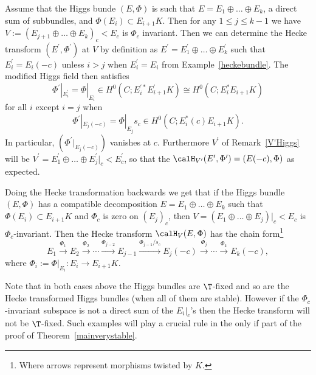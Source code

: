 \begin{example}
\notready\label{invarianthecke} Assume that the Higgs bunde $(E,\Phi)$ is such that $E=E_1\oplus \dots \oplus E_k$, a direct sum of subbundles, and $\Phi(E_i)\subset E_{i+1}K$. Then for any $1\leq j \leq k-1$ we have  $V:=(E_{j+1}\oplus \dots \oplus E_k)_c<E_c$ is $\Phi_c$ invariant. Then we can determine the Hecke transform $(E^\prime,\Phi^\prime)$ at $V$ by definition as $E^\prime=E_1^\prime \oplus \dots \oplus E^\prime_k$ such that $E_i^\prime=E_i(-c)$ unless $i>j$ when $E_i^\prime=E_i$ from Example~\ref{heckebundle}.  The modified Higgs field then satisfies $$\Phi^\prime|_{E^\prime_i}=\Phi|_{E_i}\in H^0(C;E_i^{\prime*}E^\prime_{i+1}K)\cong H^0(C;E_i^*E_{i+1}K)$$ for all $i$ except $i=j$ when $$\Phi^\prime|_{E_{j}(-c)}=\Phi|_{E_j}s_c\in H^0(C;E_i^*(c)E_{i+1}K).$$ In particular, $(\Phi^\prime|_{E_{j}(-c)})$ vanishes at $c$.
Furthermore $V^\prime$ of Remark~\ref{V'Higgs} will be $V^\prime=E^\prime_1\oplus \dots \oplus E^\prime_{j}|_c<E^\prime_c$, so that the $\calH_{V^\prime}(E^\prime,\Phi^\prime)=(E(-c),\Phi)$ as expected.

Doing the Hecke transformation backwards we get that if the Higgs bundle $(E,\Phi)$ has a compatible decomposition $E=E_1\oplus\dots\oplus E_k$ such that $\Phi(E_i)\subset E_{i+1}K$ and $\Phi_c$ is zero on $(E_j)_c$, then $V=(E_1\oplus \dots \oplus E_{j})|_c<E_c$ is $\Phi_c$-invariant.  Then the Hecke transform
$\calH_{V}(E,\Phi)$ has the chain form\footnote{Where arrows represent morphisms twisted by $K$.}
$$E_1\stackrel{\Phi_1}{\longrightarrow}{E_2}\stackrel{\Phi_2}{\longrightarrow}\cdots \stackrel{\Phi_{j-2}}{\longrightarrow}E_{j-1} \stackrel{\Phi_{j-1}/s_c}{\longrightarrow} E_j(-c)\stackrel{\Phi_{j}}{\longrightarrow}\cdots \stackrel{\Phi_{k}}{\longrightarrow}{E_k(-c)},$$ where $\Phi_i:=\Phi|_{E_i}:E_i\to E_{i+1}K$.

Note that in both cases above the Higgs bundles are $\T$-fixed and so are the Hecke transformed Higgs bundles (when all of them are stable). However if the $\Phi_c$-invariant subspace is not a direct sum of the $E_i|_c$'s then  the Hecke transform will not be $\T$-fixed. Such examples will play a crucial rule in the only if part of the proof of Theorem~\ref{mainverystable}.

	\end{example}

